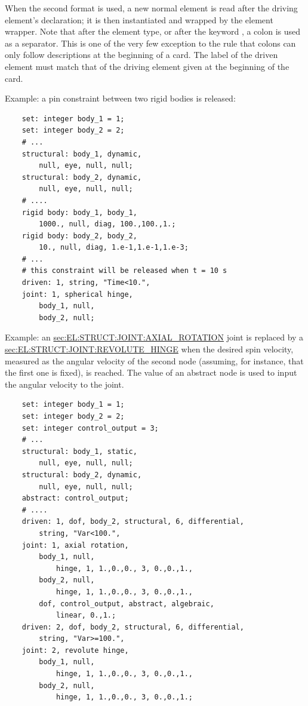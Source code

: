 When the second format is used, a new normal element is read 
after the driving element's declaration; it is then instantiated 
and wrapped by the  element wrapper.
Note that after the element type,
or after the keyword , a colon is used as a separator.
This is one of the very few  exception to the rule that colons 
can only follow descriptions at the beginning of a card.
The label of the driven element must match that of the driving element 
given at the beginning of the card.

\noindent
Example: a pin constraint between two rigid bodies is released:
\begin{verbatim}
    set: integer body_1 = 1;
    set: integer body_2 = 2;
    # ...
    structural: body_1, dynamic,
        null, eye, null, null;
    structural: body_2, dynamic,
        null, eye, null, null;
    # ....
    rigid body: body_1, body_1,
        1000., null, diag, 100.,100.,1.;
    rigid body: body_2, body_2,
        10., null, diag, 1.e-1,1.e-1,1.e-3;
    # ...
    # this constraint will be released when t = 10 s
    driven: 1, string, "Time<10.",
    joint: 1, spherical hinge,
        body_1, null,
        body_2, null;
\end{verbatim}

\noindent
Example: an
\hyperref{\kw{axial rotation}}{\kw{axial rotation} (see Section~}{)}{sec:EL:STRUCT:JOINT:AXIAL_ROTATION}
joint is replaced by a
\hyperref{\kw{revolute hinge}}{\kw{revolute hinge} (see Section~}{)}{sec:EL:STRUCT:JOINT:REVOLUTE_HINGE}
when the desired spin velocity, measured as the angular velocity
of the second node (assuming, for instance, that the first one is fixed),
is reached.
The value of an abstract node is used to input the angular velocity 
to the  joint.
\begin{verbatim}
    set: integer body_1 = 1;
    set: integer body_2 = 2;
    set: integer control_output = 3;
    # ...
    structural: body_1, static,
        null, eye, null, null;
    structural: body_2, dynamic,
        null, eye, null, null;
    abstract: control_output;
    # ....
    driven: 1, dof, body_2, structural, 6, differential,
        string, "Var<100.",
    joint: 1, axial rotation,
        body_1, null,
            hinge, 1, 1.,0.,0., 3, 0.,0.,1.,
        body_2, null,
            hinge, 1, 1.,0.,0., 3, 0.,0.,1.,
        dof, control_output, abstract, algebraic,
            linear, 0.,1.;
    driven: 2, dof, body_2, structural, 6, differential,
        string, "Var>=100.",
    joint: 2, revolute hinge,
        body_1, null,
            hinge, 1, 1.,0.,0., 3, 0.,0.,1.,
        body_2, null,
            hinge, 1, 1.,0.,0., 3, 0.,0.,1.;
\end{verbatim}

